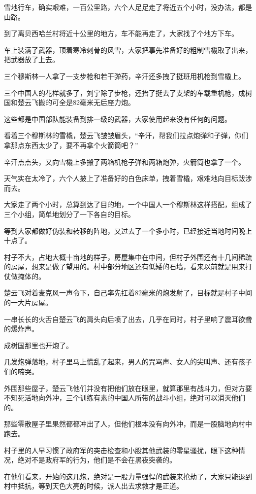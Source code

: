 雪地行车，确实艰难，一百公里路，六个人足足走了将近五个小时，没办法，都是山路。

到了离贝西哈兰村将近十公里的地方，车不能再走了，大家找了个地方下车。

车上装满了武器，顶着寒冷刺骨的风雪，大家把事先准备好的粗制雪橇取了出来，把武器放了上去。

三个穆斯林一人拿了一支步枪和若干弹药，辛汗还多拽了挺班用机枪到雪橇上。

三个中国人的花样就多了，刘宁除了步枪，还抬了挺去了支架的车载重机枪，成树国和楚云飞搬的可全是82毫米无后座力炮。

这些都是中国部队能装备到排一级的武器，大家使用起来没有任何的问题。

看着三个穆斯林的雪橇，楚云飞皱皱眉头，“辛汗，帮我们拉点炮弹和子弹，你们拿那点东西太少了，要不再拿个火箭筒吧？”

辛汗点点头，又向雪橇上多搬了两箱机枪子弹和两箱炮弹，火箭筒也拿了一个。

天气实在太冷了，六个人披上了准备好的白色床单，拽着雪橇，艰难地向目标跋涉而去。

大家走了两个小时，总算到达了目的地，一个中国人一个穆斯林这样搭配，组成了三个小组，简单地划分了一下各自的目标。

等到大家都做好伪装和转移的阵地，又过去了一个多小时，已经接近当地时间晚上十点了。

村子不大，占地大概十亩地的样子，房屋集中在中间，但村子外围还有十几间稀疏的房屋，想来是做了望用的。村中部分地区还有低矮的石墙，看来以前就是用来打仗做掩体的。

楚云飞对着麦克风一声令下，自己率先扛着82毫米的炮发射了，目标就是村子中间的一大片房屋。

一串长长的火舌自楚云飞的肩头向后喷了出去，几乎在同时，村子里响了震耳欲聋的爆炸声。

成树国那里也开炮了。

几发炮弹落地，村子里马上慌乱了起来，男人的咒骂声、女人的尖叫声、还有孩子们的啼哭。

外围那些屋子，楚云飞他们并没有把他们放在眼里，就算那里有战斗力，但对方要不知死活地向外冲，三个训练有素的中国人所带的战斗小组，绝对可以消灭他们的。

那些零散屋子里果然都都冲出了人，但他们根本没有向外冲，而是一股脑地向村中跑去。

村子里的人早习惯了政府军的突击检查和小股其他武装的零星骚扰，眼下这种情况，绝对不是政府军的行为，他们是不会在黑夜突袭的。

在他们看来，开始的这几炮，绝对是一股力量强悍的武装来抢劫了，大家只能退到村中抵抗，等到天色大亮的时候，派人出去求救才是正道。

